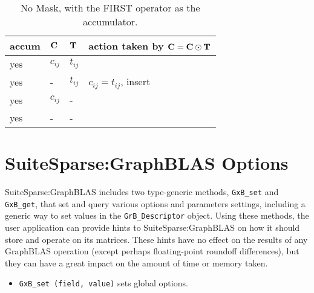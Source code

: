 \documentclass[12pt]{article}
\begin{document}
{\begin{table}[h]
\begin{center}
{\small
\begin{tabular}{lll|l}
\hline
       accum & ${\bf C}$ & ${\bf T}$        & action taken by ${\bf C = C \odot T}$ \\
\hline
        yes & $c_{ij}$ & $t_{ij}$         &  \\ 
        yes &  -       & $t_{ij}$         &  $c_{ij} = t_{ij}$, insert \\
        yes & $c_{ij}$ &  -               &   \\
        yes &  -       &  -               &   \\
\hline
\end{tabular}
}
\caption{No Mask, with the FIRST operator as the accumulator.
\label{tab:maskaccum_nomask_1st}}
\end{center}
\end{table}

\newpage
\section{SuiteSparse:GraphBLAS Options} %
\label{options}

SuiteSparse:GraphBLAS includes two type-generic methods, \verb'GxB_set' and
\verb'GxB_get', that set and query various options and parameters settings,
including a generic way to set values in the \verb'GrB_Descriptor' object.
Using these methods, the user application can provide hints to
SuiteSparse:GraphBLAS on how it should store and operate on its matrices.
These hints have no effect on the results of any GraphBLAS operation (except
perhaps floating-point roundoff differences), but they can have a great impact
on the amount of time or memory taken.

\begin{itemize}

\item \verb'GxB_set (field, value)' sets global options.


\end{itemize}}
\end{document}
